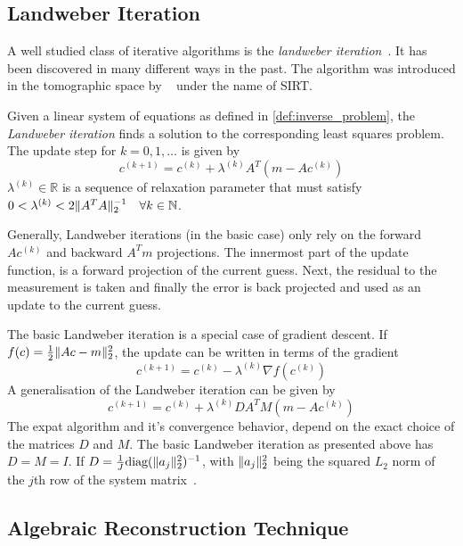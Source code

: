 \subsection{Landweber Iteration}\label{subsec:landweber_iteration}

A well studied class of iterative algorithms is the \textit{landweber
	iteration}~\cite{landweber_iteration_1951}. It has been discovered in many different ways in
the past. The algorithm was introduced in the tomographic space by
\citeauthor{gilbert_iterative_1972}~\cite{gilbert_iterative_1972} under the name of
\gls{SIRT}.

\begin{definition}\label{def:landweber_iteration}
	Given a linear system of equations as defined in \autoref{def:inverse_problem}, the
        \textit{Landweber iteration} finds a solution to the corresponding least squares problem. The update
	step for \(k = 0, 1, \dots\) is given by
	\[
		c^{(k+1)} = c^{(k)} + \lambda^{(k)} A^T(m - Ac^{(k)})
	\]
	\(\lambda^{(k)} \in \mathbb{R}\) is a sequence of relaxation parameter that must satisfy
	\(0 < \lambda^{(k)} < 2 \norm{A^T A}_2^{-1}\quad \forall k \in \mathbb{N}\).
\end{definition}

Generally, Landweber iterations (in the basic case) only rely on the forward \(Ac^{(k)}\) and backward
\(A^T m\) projections. The innermost part of the update function, is a forward projection of the
current guess. Next, the residual to the measurement is taken and finally the error is back
projected and used as an update to the current guess.

The basic Landweber iteration is a special case of gradient descent. If \(f(c) = \frac{1}{2}
\lVert Ac - m\rVert_2^2\), the update can be written in terms of the gradient
\[
	c^{(k+1)} = c^{(k)} - \lambda^{(k)} \nabla f(c^{(k)})
\]
A generalisation of the Landweber iteration can be given by
\[
	c^{(k+1)} = c^{(k)} + \lambda^{(k)} DA^TM(m - Ac^{(k)})
\]
The expat algorithm and it's convergence behavior, depend on the exact choice of the matrices \(D\)
and \(M\). The basic Landweber iteration as presented above has \(D = M = I\). If \(D = \frac{1}{J}
\text{diag}(\lVert a_j\rVert^2_2)^{-1}\), with \(\lVert a_j\rVert^2_2\) being the squared \(L_2\) norm of the
\(j\)th row of the system matrix~\cite[Chapter~6.2]{hansen_discrete_2010}.

\subsection{Algebraic Reconstruction Technique}\label{subsec:algebraic_reconstruction_technique}

